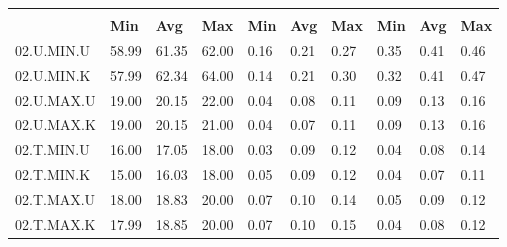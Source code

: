 \begin{tabular}{|>{\raggedright}p{}|>{\raggedright}p{}|>{\raggedright}p{}|>{\raggedright}p{}|>{\raggedright}p{}|>{\raggedright}p{}|>{\raggedright}p{}|>{\raggedright}p{}|>{\raggedright}p{}|>{\raggedright}p{}|}
\hline 
\multirow{2}{0.12\columnwidth}{\textbf{\footnotesize{}Bezeichnung}} & \multicolumn{3}{l|}{\textbf{\footnotesize{}CPU-Last {[}\%{]}}} & \multicolumn{3}{l|}{\textbf{\footnotesize{}Systemtime {[}s{]}}} & \multicolumn{3}{l|}{\textbf{\footnotesize{}Usertime {[}s{]}}}\tabularnewline
\cline{2-10} 
& \textbf{\footnotesize{}Min} & \textbf{\footnotesize{}Avg} & \textbf{\footnotesize{}Max} & \textbf{\footnotesize{}Min} & \textbf{\footnotesize{}Avg} & \textbf{\footnotesize{}Max} & \textbf{\footnotesize{}Min} & \textbf{\footnotesize{}Avg} & \textbf{\footnotesize{}Max}\tabularnewline
\hline 
\hline 
{\footnotesize{}02.U.MIN.U} & {\footnotesize{}58.99} & {\footnotesize{}61.35} & {\footnotesize{}62.00} & {\footnotesize{}0.16} & {\footnotesize{}0.21} & {\footnotesize{}0.27} & {\footnotesize{}0.35} & {\footnotesize{}0.41} & {\footnotesize{}0.46}\tabularnewline
\hline 
\hline 
{\footnotesize{}02.U.MIN.K} & {\footnotesize{}57.99} & {\footnotesize{}62.34} & {\footnotesize{}64.00} & {\footnotesize{}0.14} & {\footnotesize{}0.21} & {\footnotesize{}0.30} & {\footnotesize{}0.32} & {\footnotesize{}0.41} & {\footnotesize{}0.47}\tabularnewline
\hline 
\hline 
{\footnotesize{}02.U.MAX.U} & {\footnotesize{}19.00} & {\footnotesize{}20.15} & {\footnotesize{}22.00} & {\footnotesize{}0.04} & {\footnotesize{}0.08} & {\footnotesize{}0.11} & {\footnotesize{}0.09} & {\footnotesize{}0.13} & {\footnotesize{}0.16}\tabularnewline
\hline 
\hline 
{\footnotesize{}02.U.MAX.K} & {\footnotesize{}19.00} & {\footnotesize{}20.15} & {\footnotesize{}21.00} & {\footnotesize{}0.04} & {\footnotesize{}0.07} & {\footnotesize{}0.11} & {\footnotesize{}0.09} & {\footnotesize{}0.13} & {\footnotesize{}0.16}\tabularnewline
\hline 
\hline 
{\footnotesize{}02.T.MIN.U} & {\footnotesize{}16.00} & {\footnotesize{}17.05} & {\footnotesize{}18.00} & {\footnotesize{}0.03} & {\footnotesize{}0.09} & {\footnotesize{}0.12} & {\footnotesize{}0.04} & {\footnotesize{}0.08} & {\footnotesize{}0.14}\tabularnewline
\hline 
\hline 
{\footnotesize{}02.T.MIN.K} & {\footnotesize{}15.00} & {\footnotesize{}16.03} & {\footnotesize{}18.00} & {\footnotesize{}0.05} & {\footnotesize{}0.09} & {\footnotesize{}0.12} & {\footnotesize{}0.04} & {\footnotesize{}0.07} & {\footnotesize{}0.11}\tabularnewline
\hline 
\hline 
{\footnotesize{}02.T.MAX.U} & {\footnotesize{}18.00} & {\footnotesize{}18.83} & {\footnotesize{}20.00} & {\footnotesize{}0.07} & {\footnotesize{}0.10} & {\footnotesize{}0.14} & {\footnotesize{}0.05} & {\footnotesize{}0.09} & {\footnotesize{}0.12}\tabularnewline
\hline 
\hline 
{\footnotesize{}02.T.MAX.K} & {\footnotesize{}17.99} & {\footnotesize{}18.85} & {\footnotesize{}20.00} & {\footnotesize{}0.07} & {\footnotesize{}0.10} & {\footnotesize{}0.15} & {\footnotesize{}0.04} & {\footnotesize{}0.08} & {\footnotesize{}0.12}\tabularnewline
\hline 
\end{tabular}
\par
